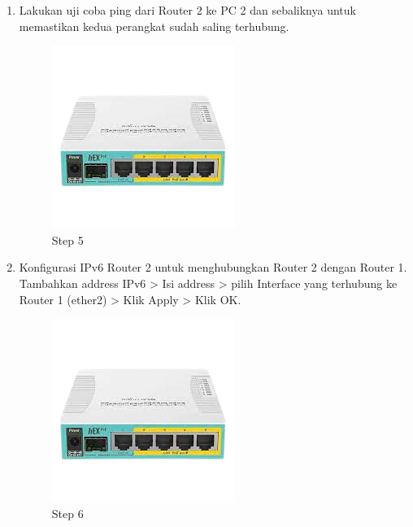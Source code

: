 \begin{enumerate}
	\item Lakukan uji coba ping dari Router 2 ke PC 2 dan sebaliknya untuk memastikan kedua perangkat
	sudah saling terhubung.	
	
	\begin{figure}[H]
		\centering
		\includegraphics[width=0.7\linewidth]{P1/img/contoh.png}
		\caption{Step 5}
		\label{fig:gambar1}
	\end{figure}

	\item Konfigurasi IPv6 Router 2 untuk menghubungkan Router 2 dengan Router 1. Tambahkan
	address IPv6 > Isi address > pilih Interface yang terhubung ke Router 1 (ether2) > Klik Apply > Klik OK.
	
	\begin{figure}[H]
		\centering
		\includegraphics[width=0.7\linewidth]{P1/img/contoh.png}
		\caption{Step 6}
		\label{fig:gambar1}
	\end{figure}


\end{enumerate}
